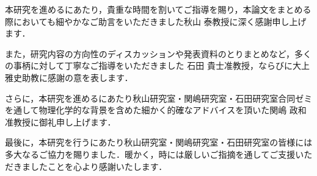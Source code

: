 \begin{syaji}
本研究を進めるにあたり，貴重な時間を割いてご指導を賜り，本論文をまとめる際においても細やかなご助言をいただきました秋山 泰教授に深く感謝申し上げます．

また，研究内容の方向性のディスカッションや発表資料のとりまとめなど，多くの事柄に対して丁寧なご指導をいただきました
石田 貴士准教授，ならびに大上 雅史助教に感謝の意を表します．

さらに，本研究を進めるにあたり秋山研究室・関嶋研究室・石田研究室合同ゼミを通して物理化学的な背景を含めた細かく的確なアドバイスを頂いた関嶋 政和准教授に御礼申し上げます．

最後に，本研究を行うにあたり秋山研究室・関嶋研究室・石田研究室の皆様には多大なるご協力を賜りました．暖かく，時には厳しいご指摘を通してご支援いただきましたことを心より感謝いたします．


\end{syaji}

